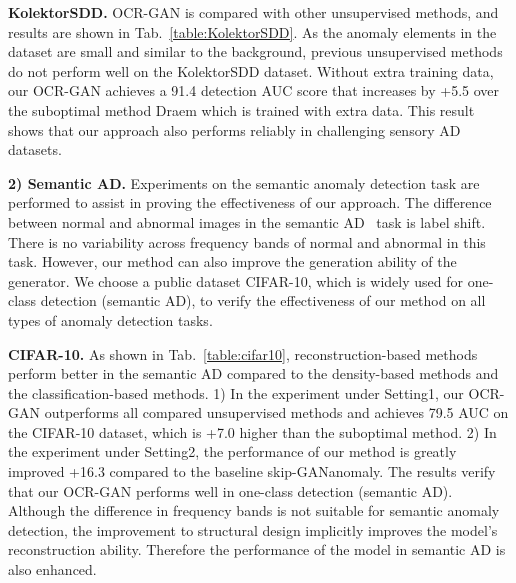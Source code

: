 \documentclass[lettersize,journal]{IEEEtran}
\begin{document}
\noindent\textbf{KolektorSDD.} OCR-GAN is compared with other unsupervised methods, and results are shown in Tab.~\ref{table:KolektorSDD}. As the anomaly elements in the dataset are small and similar to the background, previous unsupervised methods do not perform well on the KolektorSDD dataset. Without extra training data, our OCR-GAN achieves a 91.4 detection AUC score that increases by +5.5 over the suboptimal method Draem which is trained with extra data. This result shows that our approach also performs reliably in challenging sensory AD datasets.


\noindent\textbf{2) Semantic AD.} Experiments on the semantic anomaly detection task are performed to assist in proving the effectiveness of our approach. The difference between normal and abnormal images in the semantic AD~\cite{perera2019learning} task is label shift. There is no variability across frequency bands of normal and abnormal in this task. However, our method can also improve the generation ability of the generator. We choose a public dataset CIFAR-10, which is widely used for one-class detection (semantic AD), to verify the effectiveness of our method on all types of anomaly detection tasks.

\noindent\textbf{CIFAR-10.} As shown in Tab.~\ref{table:cifar10}, reconstruction-based methods perform better in the semantic AD compared to the density-based methods and the classification-based methods. 1) In the experiment under Setting1, our OCR-GAN outperforms all compared unsupervised methods and achieves 79.5 AUC on the CIFAR-10 dataset, which is +7.0 higher than the suboptimal method. 2) In the experiment under Setting2, the performance of our method is greatly improved +16.3 compared to the baseline skip-GANanomaly. The results verify that our OCR-GAN performs well in one-class detection (semantic AD). Although the difference in frequency bands is not suitable for semantic anomaly detection, the improvement to structural design implicitly improves the model's reconstruction ability. Therefore the performance of the model in semantic AD is also enhanced.
\end{document}
